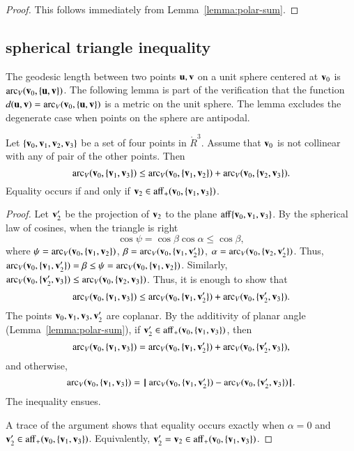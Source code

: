 \begin{proof} This follows immediately from 
Lemma~\ref{lemma:polar-sum}.
\end{proof}


\subsection{spherical triangle inequality} %
%
%

The geodesic length between two points
$\u,\v$ on a unit sphere centered at $\v_0$ is $\arc_V(\v_0,\{\u,\v\})$.
The following lemma is part of the verification that
the function $d(\u,\v) = \arc_V(\v_0,\{\u,\v\})$ is a metric
on the unit sphere.  The lemma excludes the degenerate case when
points on the sphere are antipodal.
%

\begin{lemma}[]\label{lemma:sph-tri-ineq}

Let $\{\v_0,\v_1,\v_2,\v_3\}$ be a set of four points in $\ring{R}^3$.
Assume that $\v_0$ is not collinear with any of pair of the other points.
Then
\[ 
  \arc_V(\v_0,\{\v_1,\v_3\}) \le \arc_V(\v_0,\{\v_1,\v_2\}) + \arc_V(\v_0,\{\v_2,\v_3\}).
\] 
Equality occurs if and only if $\v_2\in\op{aff}_+(\v_0,\{\v_1,\v_3\})$.
\end{lemma}

\begin{proof} Let $\v_2'$ be the projection of $\v_2$ to the plane
$\op{aff}\{\v_0,\v_1,\v_3\}$.  
By the spherical law of cosines, when the triangle is right
\[ 
\cos\psi = \cos\beta\cos\alpha \le \cos\beta,
\] 
where $\psi = \arc_V(\v_0,\{\v_1,\v_2\})$, $\beta =
\arc_V(\v_0,\{\v_1,\v_2'\})$, $\alpha=\arc_V(\v_0,\{\v_2,\v_2'\})$.  Thus,
$\arc_V(\v_0,\{\v_1,\v_2'\})=\beta\le \psi=\arc_V(\v_0,\{\v_1,\v_2\})$.
Similarly, $\arc_V(\v_0,\{\v_2',\v_3\}) \le \arc_V(\v_0,\{\v_2,\v_3\})$.
Thus, it is enough to show that
\[ 
  \arc_V(\v_0,\{\v_1,\v_3\}) \le \arc_V(\v_0,\{\v_1,\v_2'\}) + \arc_V(\v_0,\{\v_2',\v_3\}).
\] 
The points $\v_0,\v_1,\v_3,\v_2'$ are coplanar.
By the additivity of planar angle (Lemma~\ref{lemma:polar-sum}), if 
$\v_2'\in \op{aff}_+(\v_0,\{\v_1,\v_3\})$, then
\[ 
  \arc_V(\v_0,\{\v_1,\v_3\}) = \arc_V(\v_0,\{\v_1,\v_2'\}) + \arc_V(\v_0,\{\v_2',\v_3\}),   
\] 
and otherwise,
\[ 
  \arc_V(\v_0,\{\v_1,\v_3\}) = \norm{\arc_V(\v_0,\{\v_1,\v_2'\}) }{ \arc_V(\v_0,\{\v_2',\v_3\})}.
\] 
The inequality ensues.

A trace of the argument shows that equality occurs exactly when
$\alpha=0$ and $\v_2'\in \op{aff}_+(\v_0,\{\v_1,\v_3\})$.  Equivalently,
$\v_2'=\v_2\in\op{aff}_+(\v_0,\{\v_1,\v_3\})$.
\end{proof}

